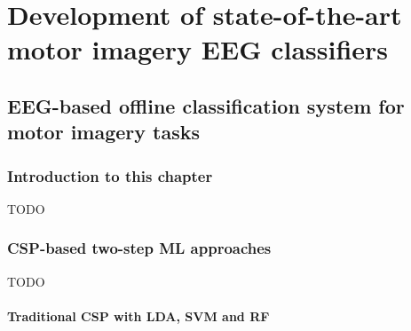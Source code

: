 





\part{Development of state-of-the-art motor imagery EEG classifiers}
\label{part:development}

\chapter{EEG-based offline classification system for motor imagery tasks}
\label{ch:offline_bci_system}

\section{Introduction to this chapter}
\label{sec:offline_bci_system_introduction}

TODO

\section{CSP-based two-step ML approaches}
\label{sec:offline_bci_system_two_step_ml}

TODO


\subsection{Traditional CSP with LDA, SVM and RF}
\label{subsec:offline_bci_system_two_step_ml_basic_csp}

